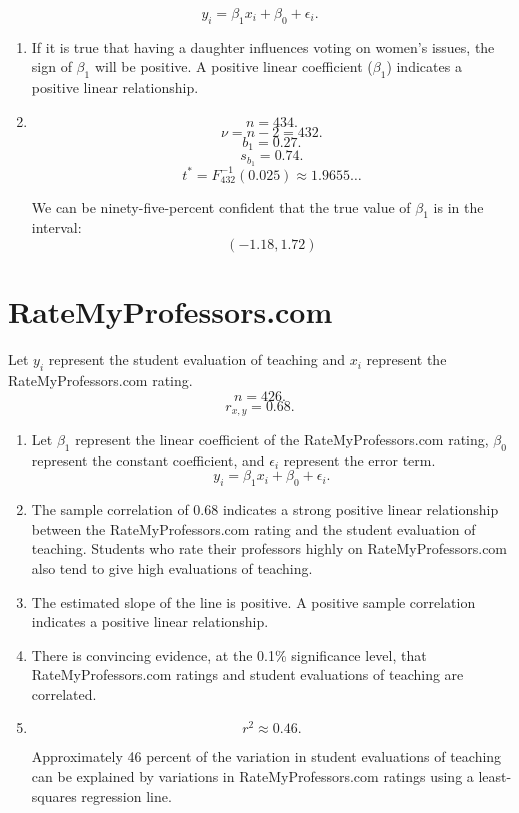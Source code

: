 \documentclass[12pt]{article}
\begin{document}
\[y_i=\beta_1x_i+\beta_0+\epsilon_i.\]

\begin{enumerate}
\item If it is true that having a daughter influences voting on women's issues, the sign of $\beta_1$ will be positive. A positive linear coefficient ($\beta_1$) indicates a positive linear relationship.
\item
\[n=434.\]
\[\nu=n-2=432.\]
\[b_1=0.27.\]
\[s_{b_1}=0.74.\]
\[t^*=F^{-1}_{432}(0.025)\approx 1.9655\dots\]

We can be ninety-five-percent confident that the true value of $\beta_1$ is in the interval:
\[(-1.18,1.72)\]

\end{enumerate}
\section{RateMyProfessors.com}
Let $y_i$ represent the student evaluation of teaching and $x_i$ represent the RateMyProfessors.com rating.
\[n=426.\]
\[r_{x,y}=0.68.\]
\begin{enumerate}
\item Let $\beta_1$ represent the linear coefficient of the RateMyProfessors.com rating, $\beta_0$ represent the constant coefficient, and $\epsilon_i$ represent the error term.
\[y_i=\beta_1x_i+\beta_0+\epsilon_i.\]
\item The sample correlation of 0.68 indicates a strong positive linear relationship between the RateMyProfessors.com rating and the student evaluation of teaching. Students who rate their professors highly on RateMyProfessors.com also tend to give high evaluations of teaching.
\item The estimated slope of the line is positive. A positive sample correlation indicates a positive linear relationship.
\item There is convincing evidence, at the 0.1\% significance level, that RateMyProfessors.com ratings and student evaluations of teaching are correlated.
\item\[r^2\approx 0.46.\]

Approximately 46 percent of the variation in student evaluations of teaching can be explained by variations in RateMyProfessors.com ratings using a least-squares regression line.
\end{enumerate}
\end{document}
